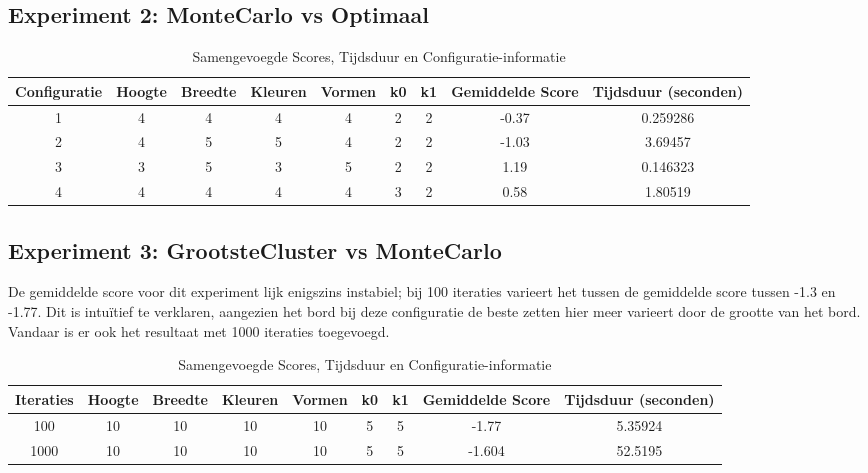 \documentclass[10pt]{article}
\begin{document}
\subsection{Experiment 2: MonteCarlo vs Optimaal}

\begin{table}[h]
    \centering
    \caption{Samengevoegde Scores, Tijdsduur en Configuratie-informatie}
    \begin{tabular}{@{}ccccccccc@{}}
        \toprule
        Configuratie & Hoogte & Breedte  & Kleuren& Vormen & k0 & k1 & Gemiddelde Score & Tijdsduur (seconden) \\ 
        \midrule
        1 & 4 & 4 & 4 & 4 &  2 & 2 & -0.37 & 0.259286 \\
        2 & 4 & 5 & 5 & 4 &  2 & 2 & -1.03 & 3.69457 \\
        3 & 3 & 5 & 3 & 5 &  2 & 2 & 1.19 & 0.146323 \\
        4 & 4 & 4 & 4 & 4 &  3 & 2 & 0.58 & 1.80519 \\
        \bottomrule
    \end{tabular}
\end{table}
\FloatBarrier

\subsection{Experiment 3: GrootsteCluster vs MonteCarlo }
De gemiddelde score voor dit experiment lijk enigszins instabiel; bij 100 iteraties varieert het tussen de gemiddelde score tussen -1.3 en -1.77.
Dit is intu\"itief te verklaren, aangezien het bord bij deze configuratie de beste zetten hier meer varieert door de grootte van het bord.
Vandaar is er ook het resultaat met 1000 iteraties toegevoegd.

\begin{table}[h]
    \centering
    \caption{Samengevoegde Scores, Tijdsduur en Configuratie-informatie}
    \begin{tabular}{@{}ccccccccc@{}}
        \toprule
        Iteraties & Hoogte & Breedte & Kleuren & Vormen & k0 & k1 & Gemiddelde Score & Tijdsduur (seconden) \\ 
        \midrule
        100 & 10 & 10 & 10 & 10 & 5 & 5 & -1.77 & 5.35924 \\
        1000 & 10 & 10 & 10 & 10 & 5 & 5    & -1.604 & 52.5195 \\
        \bottomrule
    \end{tabular}
\end{table}
\FloatBarrier 
\end{document}
